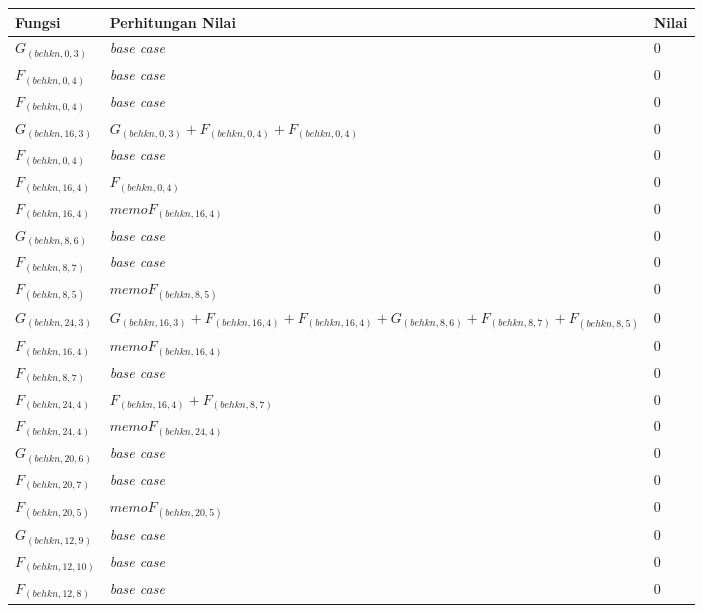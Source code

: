 \begin{appendices}
  \begin{table}[H]
  	\centering
  	\begin{tabular} {|p{3cm}|p{5cm}|p{1cm}|} \hline
  		Fungsi & Perhitungan Nilai & Nilai \\ \hline
  		$ G_{(behkn, 0, 3)} $ & \textit{base case} & $ 0 $ \\ \hline
  		$ F_{(behkn, 0, 4)} $ & \textit{base case} & $ 0 $ \\ \hline
  		$ F_{(behkn, 0, 4)} $ & \textit{base case} & $ 0 $ \\ \hline
  		$ G_{(behkn, 16, 3)}  $ & $G_{(behkn, 0, 3)} + F_{(behkn, 0, 4)} + F_{(behkn, 0, 4)}$ & $ 0 $ \\ \hline
  		$ F_{(behkn, 0, 4)} $ & \textit{base case} & $ 0 $ \\ \hline
  		$ F_{(behkn, 16, 4)}  $ & $F_{(behkn, 0, 4)}$ & $ 0 $ \\ \hline
  		$ F_{(behkn, 16, 4)}  $ & $memoF_{(behkn, 16, 4)}$ & $ 0 $ \\ \hline
  		$ G_{(behkn, 8, 6)} $ & \textit{base case} & $ 0 $ \\ \hline
  		$ F_{(behkn, 8, 7)} $ & \textit{base case} & $ 0 $ \\ \hline
  		$ F_{(behkn, 8, 5)}  $ & $memoF_{(behkn, 8, 5)}$ & $ 0 $ \\ \hline
  		$ G_{(behkn, 24, 3)}  $ & $G_{(behkn, 16, 3)} + F_{(behkn, 16, 4)} + F_{(behkn, 16, 4)} + G_{(behkn, 8, 6)} + F_{(behkn, 8, 7)} + F_{(behkn, 8, 5)}$ & $ 0 $ \\ \hline
  		$ F_{(behkn, 16, 4)}  $ & $memoF_{(behkn, 16, 4)}$ & $ 0 $ \\ \hline
  		$ F_{(behkn, 8, 7)} $ & \textit{base case} & $ 0 $ \\ \hline
  		$ F_{(behkn, 24, 4)}  $ & $F_{(behkn, 16, 4)} + F_{(behkn, 8, 7)}$ & $ 0 $ \\ \hline
  		$ F_{(behkn, 24, 4)}  $ & $memoF_{(behkn, 24, 4)}$ & $ 0 $ \\ \hline
  		$ G_{(behkn, 20, 6)} $ & \textit{base case} & $ 0 $ \\ \hline
  		$ F_{(behkn, 20, 7)} $ & \textit{base case} & $ 0 $ \\ \hline
  		$ F_{(behkn, 20, 5)}  $ & $memoF_{(behkn, 20, 5)}$ & $ 0 $ \\ \hline
  		$ G_{(behkn, 12, 9)} $ & \textit{base case} & $ 0 $ \\ \hline
  		$ F_{(behkn, 12, 10)} $ & \textit{base case} & $ 0 $ \\ \hline
  		$ F_{(behkn, 12, 8)} $ & \textit{base case} & $ 0 $ \\ \hline

\end{tabular}
\end{table}
\end{appendices}
